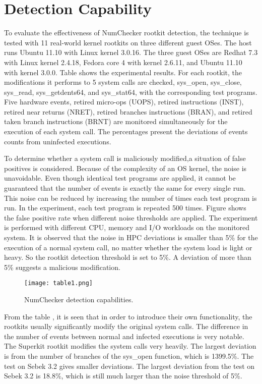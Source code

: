 \documentclass[12pt]{report}
\begin{document}
\section{Detection Capability}
To evaluate the effectiveness of NumChecker rootkit detection,
the  technique is tested with 11 real-world kernel rootkits
on three different guest OSes. The host runs Ubuntu 11.10
with Linux kernel 3.0.16. The three guest OSes are Redhat 7.3
with Linux kernel 2.4.18, Fedora core 4 with kernel 2.6.11,
and Ubuntu 11.10 with kernel 3.0.0. Table shows the experimental
results. For each rootkit, the modifications
it performs to 5 system calls are checked, sys\_open, sys\_close, sys\_read,
sys\_getdents64, and sys\_stat64, with the corresponding test
programs. Five hardware events, retired micro-ops (UOPS),
retired instructions (INST), retired near returns (NRET), retired
branches instructions (BRAN), and retired taken branch
instructions (BRNT) are monitored simultaneously for the
execution of each system call. The percentages present the
deviations of events counts from uninfected executions.

To determine whether a system call is maliciously modified,a situation of false positives is considered. Because
of the complexity of an OS kernel, the noise is unavoidable.
Even though identical test programs are applied, it cannot be
guaranteed that the number of events is exactly the same for
every single run. This noise can be reduced by increasing the
number of times each test program is run. In the experiment,
each test program is repeated 500 times. Figure shows the
false positive rate when different noise thresholds are applied.
The experiment is performed with different CPU, memory and
I/O workloads on the monitored system. It is observed  that the
noise in HPC deviations is smaller than 5\% for the execution
of a normal system call, no matter whether the system load
is light or heavy. So the rootkit detection threshold is set
to 5\%. A deviation of more than 5\% suggests a malicious
modification.

\begin{figure}[h]
\centering
\texttt{[image: table1.png]}
\caption{NumChecker detection capabilities.}
\end{figure}

From the table , it is seen that in order to introduce their
own functionality, the rootkits usually significantly modify
the original system calls. The difference in the number of
events between normal and infected executions is very notable.
The Superkit rootkit modifies the system calls very heavily.
The largest deviation is from the number of branches of the
sys\_open function, which is 1399.5\%. The test on Sebek 3.2
gives smaller deviations. The largest deviation from the test
on Sebek 3.2 is 18.8\%, which is still much larger than the
noise threshold of 5\%.
\end{document}
